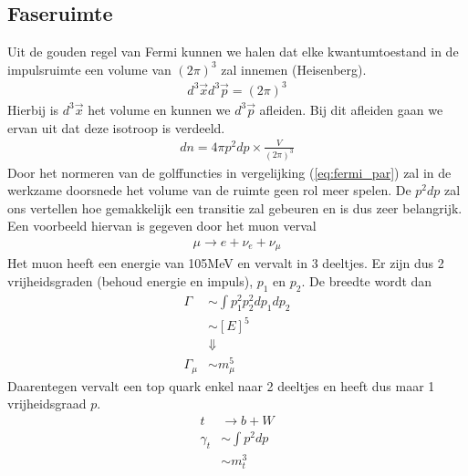 \documentclass[../main.tex]{subfiles}
\begin{document}
\subsection{Faseruimte}%
\label{sub:faseruimte}

Uit de gouden regel van Fermi kunnen we halen dat elke kwantumtoestand in de impulsruimte een volume van $(2\pi)^3$ zal innemen (Heisenberg).
\begin{equation}
    \begin{aligned}
        \label{eq:fermi_faseruimte}
        d^3\vec{x}d^3\vec{p} = (2\pi)^3
    \end{aligned}
\end{equation}
Hierbij is $d^3\vec{x}$ het volume en kunnen we $d^3\vec{p}$ afleiden. Bij dit afleiden gaan we ervan uit dat deze isotroop is verdeeld.
\begin{equation}
    \begin{aligned}
        \label{eq:fermi_aantal_deeltjes}
        dn=4\pi p^2dp\times \frac{V}{(2\pi)^3} 
    \end{aligned}
\end{equation}
Door het normeren van de golffuncties in vergelijking (\ref{eq:fermi_par}) zal in de werkzame doorsnede het volume van de ruimte geen rol meer spelen. De $p^2dp$ zal ons vertellen hoe gemakkelijk een transitie zal gebeuren en is dus zeer belangrijk. Een voorbeeld hiervan is gegeven door het muon verval
\begin{equation}
    \begin{aligned}
        \label{eq:muon_verval}
        \mu \rightarrow e+\nu_e + \nu_\mu
    \end{aligned}
\end{equation}
Het muon heeft een energie van 105MeV en vervalt in 3 deeltjes. Er zijn dus 2 vrijheidsgraden (behoud energie en impuls), $p_1$ en $p_2$. De breedte wordt dan
\begin{equation}
    \begin{aligned}
        \label{eq:breedte_muon}
        \Gamma &\sim \int p_1^2 p_2^2 dp_1 dp_2\\
               &\sim [E]^5\\
               &\Downarrow\\
        \Gamma_\mu &\sim m_\mu^5
    \end{aligned}
\end{equation}
Daarentegen vervalt een top quark enkel naar 2 deeltjes en heeft dus maar 1 vrijheidsgraad $p$.
\begin{equation}
    \begin{aligned}
        \label{eq:top_verval}
        t&\rightarrow b+W\\
        \gamma_t &\sim \int p^2dp\\
                 &\sim m_t^3
    \end{aligned}
\end{equation}
\end{document}
